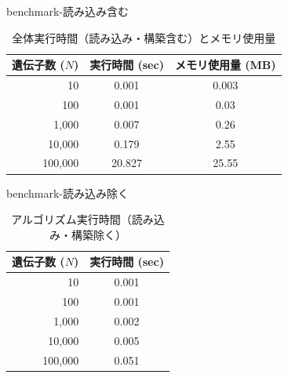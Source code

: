 \begin{frame}{benchmark-読み込み含む}

	\begin{table}[H]
			\centering
			\caption{全体実行時間（読み込み・構築含む）とメモリ使用量}
			\label{tab:benchmark_total}
			\begin{tabular}{rcc}
					\hline
					遺伝子数 ($N$) & 実行時間 (sec) & メモリ使用量 (MB) \\
					\hline
					10      & 0.001 & 0.003 \\
					100     & 0.001 & 0.03 \\
					1,000   & 0.007 & 0.26 \\
					10,000  & 0.179 & 2.55 \\
					100,000 & 20.827 & 25.55 \\
					\hline
			\end{tabular}
	\end{table}
\end{frame}

\begin{frame}{benchmark-読み込み除く}
	\begin{table}[H]
			\centering
			\caption{アルゴリズム実行時間（読み込み・構築除く）}
			\label{tab:benchmark_algo}
			\begin{tabular}{rc}
					\hline
					遺伝子数 ($N$) & 実行時間 (sec) \\
					\hline
					10      & 0.001 \\
					100     & 0.001 \\
					1,000   & 0.002 \\
					10,000  & 0.005 \\
					100,000 & 0.051 \\
					\hline
			\end{tabular}
	\end{table}
\end{frame}
